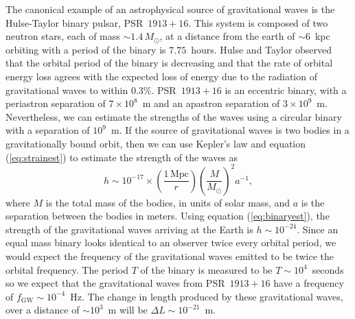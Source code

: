 The canonical example of an astrophysical source of gravitational waves is the
Hulse-Taylor binary pulsar, PSR~$1913+16$\cite{1975ApJ...195L..51H}. This
system is composed of two neutron stars, each of mass $\sim 1.4\,M_\odot$, at
a distance from the earth of $\sim 6$~kpc orbiting with a period of the binary
is $7.75$~hours.
Hulse and Taylor observed that the
orbital period of the binary is decreasing and that the rate of orbital energy
loss agrees with the expected loss of energy due to the radiation of
gravitational waves to within $0.3\%$\cite{Taylor:1982,Taylor:1989}.
PSR~$1913+16$ is an eccentric binary, with a periastron separation of
$7\times10^{8}$~m and an apastron separation of $3\times10^{9}$~m.
Nevertheless, we can estimate the strengths of the waves using a circular
binary with a separation of $10^{9}$~m.  If the source of
gravitational waves is two bodies in a gravitationally bound orbit, then we
can use Kepler's law and equation (\ref{eq:strainest}) to estimate the
strength of the waves as
\begin{equation}
h \sim 10^{-17} \times \left(\frac{1\,\mathrm{Mpc}}{r}\right)
\left(\frac{M}{M_\odot}\right)^2 a^{-1},
\label{eq:binaryest}
\end{equation}
where $M$ is the total mass of the bodies, in units of solar mass, and $a$ is
the separation between the bodies in meters.
Using equation (\ref{eq:binaryest}), the strength of the gravitational waves
arriving at the Earth is $h \sim 10^{-24}$. Since an equal mass binary looks
identical to an observer twice every orbital period, we would expect the
frequency of the gravitational waves emitted to be twice the orbital
frequency. The period $T$ of the binary is measured to be $T\sim 10^4$~seconds
so we expect that the gravitational waves from PSR~$1913+16$ have a frequency
of $f_\mathrm{GW} \sim 10^{-4}$~Hz.  The change in length produced by these
gravitational waves, over a distance of $\sim 10^3$~m will be $\Delta L \sim
10^{-21}$~m.


